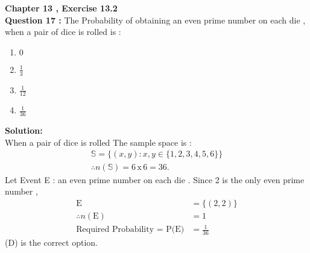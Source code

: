 \documentclass[journal,12pt,twocolumn]{IEEEtran}
\begin{document}
\textbf{Chapter 13 , Exercise 13.2 }\\[6pt]
\textbf{Question 17 :}
The Probability of obtaining an even prime number on each die , when a pair of dice is rolled is :\\
\begin{enumerate}
    \item[A)] $0$ \\ 
    \item[B)] $\displaystyle{\frac{1}{3}}$ \\ 
    \item[C)] $\displaystyle{\frac{1}{12}}$ \\ 
    \item[D)] $\displaystyle{\frac{1}{36}}$ \\
\end{enumerate}

\textbf{Solution:} \\[6pt]
When a pair of dice is rolled The sample space is :
\begin{align*}
\mathbb{S}=\{(x,y) : x,y \in \{ 1,2,3,4,5,6\}\}\\
\therefore n(\mathbb{S})=6 \,\text{x}\, 6 = 36.
\end{align*}
Let Event E : an even prime number on each die .  Since 2 is the only even prime number ,
\begin{align*}
    \text{E} &= \{(2,2)\} \\
\therefore n(\text{E})&=1\\
\text{Required Probability = P(E)} &= \frac{1}{36}
\end{align*}
(D) is the correct option.
\end{document}
